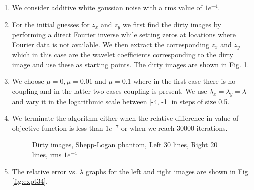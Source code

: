\begin{enumerate}
\item We consider additive white gaussian noise with a rms value of $1e^{-4}$.
\item For the initial guesses for $z_x$ and $z_y$ we first find the dirty images by performing a direct Fourier inverse while setting zeros at locations where Fourier data is not available. We then extract the corresponding $z_x$ and $z_y$ which in this case are the wavelet coefficients corresponding to the dirty image and use these as starting points. The dirty images are shown in Fig. \ref{fig:expt33}.

\item We choose $\mu = 0, \mu = 0.01$ and $\mu = 0.1$ where in the first case there is no coupling and in the latter two cases coupling is present. We use $\lambda_x = \lambda_y = \lambda$ and vary it in the logarithmic scale between [-4, -1] in steps of size 0.5. 
\item We terminate the algorithm either when the relative difference in value of objective function is less than $1e^{-7}$ or when we reach 30000 iterations.


\begin{figure}[!b]
\hspace{0.4in}
		\hspace{0.2in}
\caption [Dirty images,  Shepp-Logan phantom, Left 30 lines, Right 20 lines, rms $1e^{-4}$]{Dirty images, Shepp-Logan phantom, Left 30 lines, Right 20 lines, rms $1e^{-4}$}
\label{fig:expt33}
\end{figure}
\item The relative error vs.  $\lambda$ graphs for the left and right images are shown in Fig. \ref{fig:expt34}.


\end{enumerate}
